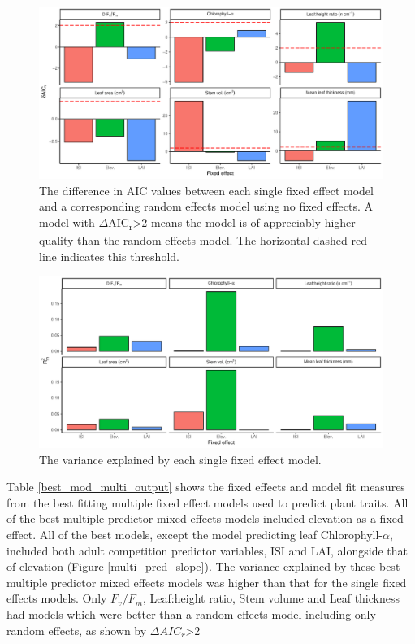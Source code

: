 \documentclass[a4paper, 11pt]{article}
\begin{document}
\begin{figure}[H]
\includegraphics[width=\textwidth]{single_pred_daic}
\centering
\caption{The difference in AIC values between each single fixed effect model and a corresponding random effects model using no fixed effects. A model with $\Delta$AIC\textsubscript{r}\textgreater{}2 means the model is of appreciably higher quality than the random effects model. The horizontal dashed red line indicates this threshold.}
\label{single_pred_daic}
\end{figure}

\begin{figure}[H]
\includegraphics[width=\textwidth]{single_pred_r2m}
\centering
\caption{The variance explained by each single fixed effect model.}
\label{single_pred_r2m}
\end{figure}

Table \ref{best_mod_multi_output} shows the fixed effects and model fit measures from the best fitting multiple fixed effect models used to predict plant traits. All of the best multiple predictor mixed effects models included elevation as a fixed effect. All of the best models, except the model predicting leaf Chlorophyll-$\alpha$, included both adult competition predictor variables, ISI and LAI, alongside that of elevation (Figure \ref{multi_pred_slope}). The variance explained by these best multiple predictor mixed effects models was higher than that for the single fixed effects models. Only $F_v/F_m$, Leaf:height ratio, Stem volume and Leaf thickness had models which were better than a random effects model including only random effects, as shown by $\Delta{}AIC_r$\textgreater{}2
\end{document}
